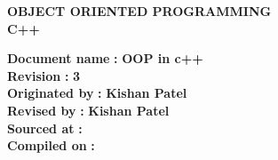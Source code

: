 \documentclass[main.tex]{subfiles}
\begin{document}
\begin{titlepage}

\begin{center}
\LARGE{\bf{OBJECT ORIENTED PROGRAMMING \\C++\\}}
  \horrule{0.4pt}
\end{center}
\begin{tabbing}
  \textbf{Document name} \= \textbf{:} \textbf{OOP in c++} \\
  \textbf{Revision}      \> \textbf{:} \textbf{3} \\
  \textbf{Originated by} \> \textbf{:} \textbf{Kishan Patel} \\
  \textbf{Revised by}    \> \textbf{:} \textbf{Kishan Patel} \\
  \textbf{Sourced at}    \> \textbf{:} \textbf{} \\
  \textbf{Compiled on}   \> \textbf{:} \textbf{\DTMnow{}}
\end{tabbing}
\horrule{0.4pt}
\end{titlepage}
\end{document}
